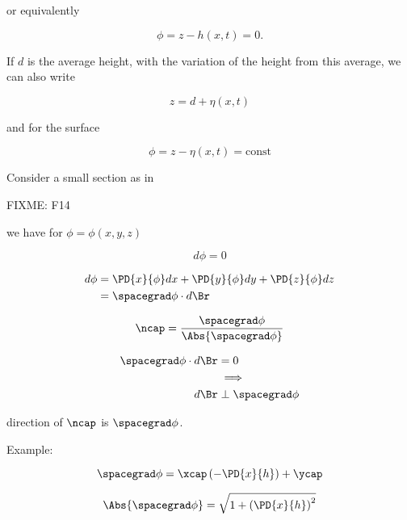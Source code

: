 or equivalently

\begin{equation}\label{eqn:continuumL13:n}
\phi = z - h(x, t) = 0.
\end{equation}

If $d$ is the average height, with the variation of the height from this average, we can also write

\begin{equation}\label{eqn:continuumL13:n}
z = d + \eta(x, t)
\end{equation}

and for the surface

\begin{equation}\label{eqn:continuumL13:n}
\phi = z - \eta(x, t) = \text{const}
\end{equation}

Consider a small section as in

FIXME: F14

we have for $\phi = \phi(x, y, z)$

\begin{equation}\label{eqn:continuumL13:n}
d\phi = 0 
\end{equation}

\begin{align*}
d\phi &= 
\PD{x}{\phi} dx
+\PD{y}{\phi} dy
+\PD{z}{\phi} dz \\
&= \spacegrad \phi \cdot d\Br
\end{align*}

\begin{equation}\label{eqn:continuumL13:n}
\ncap = \frac{\spacegrad \phi}{\Abs{\spacegrad \phi}}
\end{equation}

\begin{align*}
\spacegrad \phi \cdot d\Br &= 0 \\
&\implies \\
d\Br &\perp \spacegrad \phi
\end{align*}

direction of $\ncap$ is $\spacegrad \phi$.

Example:

\begin{equation}\label{eqn:continuumL13:n}
\spacegrad \phi = \xcap \left( -\PD{x}{h} \right) + \ycap
\end{equation}

\begin{equation}\label{eqn:continuumL13:n}
\Abs{\spacegrad \phi} = \sqrt{ 1 + \left( \PD{x}{h} \right)^2 }
\end{equation}


